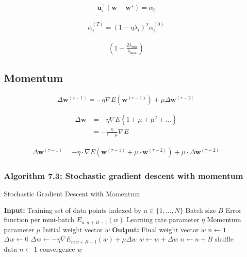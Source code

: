 \documentclass{article}
\begin{document}
\begin{align*}
\mathbf{u}_{i}^{\top}\left(\mathbf{w}-\mathbf{w}^{\star}\right)=\alpha_{i}
\tag{7.28}
\end{align*}

\begin{align*}
\alpha_{i}^{(T)}=\left(1-\eta \lambda_{i}\right)^{T} \alpha_{i}^{(0)}
\tag{7.29}
\end{align*}

\begin{align*}
\left(1-\frac{2 \lambda_{\min }}{\lambda_{\max }}\right)
\tag{7.30}
\end{align*}

\subsection{Momentum}

\begin{align*}
\Delta \mathbf{w}^{(\tau-1)}=-\eta \nabla E\left(\mathbf{w}^{(\tau-1)}\right)+\mu \Delta \mathbf{w}^{(\tau-2)}
\tag{7.31}
\end{align*}

\begin{align*}
\Delta \mathbf{w} & =-\eta \nabla E\left\{1+\mu+\mu^{2}+\ldots\right\}  
\tag{7.32}\\
& =-\frac{\eta}{1-\mu} \nabla E
\tag{7.33}
\end{align*}

\begin{align*}
\Delta \mathbf{w}^{(\tau-1)} = - \eta \cdot \nabla E (\mathbf{w}^{(\tau - 1)} + \mu \cdot \mathbf{w}^{(\tau - 2)}) + \mu \cdot \Delta \mathbf{w}^{(\tau - 2)} 
\tag{7.34}
\end{align*}

\subsubsection{Algorithm 7.3: Stochastic gradient descent with momentum}

\begin{algorithm}
\caption{Stochastic Gradient Descent with Momentum}
\begin{algorithmic}[1]
\STATE \textbf{Input:} Training set of data points indexed by $n \in \{1, \ldots, N\}$
\STATE \quad Batch size $B$
\STATE \quad Error function per mini-batch $E_{n:n+B-1}(w)$
\STATE \quad Learning rate parameter $\eta$
\STATE \quad Momentum parameter $\mu$
\STATE \quad Initial weight vector $w$
\STATE \textbf{Output:} Final weight vector $w$
\STATE $n \gets 1$
\STATE $\Delta w \gets 0$
\REPEAT
    \STATE $\Delta w \gets -\eta \nabla E_{n:n+B-1}(w) + \mu \Delta w$ 
    \STATE $w \gets w + \Delta w$ 
    \STATE $n \gets n + B$
        \STATE shuffle data
        \STATE $n \gets 1$
    \ENDIF
\UNTIL convergence
\RETURN $w$
\end{algorithmic}
\end{algorithm}
\end{document}
